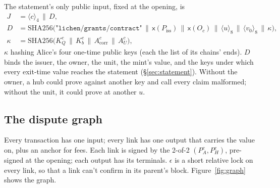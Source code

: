 \documentclass[11pt]{article}
\theoremstyle{plain}
\theoremstyle{definition}
\newcommand{\be}[2]{\langle #1\rangle_{#2}}
\newcommand{\xo}[1]{\mathsf{x}(#1)}
\newcommand{\Piss}{P_{\mathrm{iss}}}
\newcommand{\PH}{P_H^{c}}
\newcommand{\Oc}{O_c}
\newcommand{\KQ}{K_{Q}^{c}}
\newcommand{\Kb}{K_{b}^{c}}
\newcommand{\Acorr}{A_{\mathrm{corr}}^{c}}
\newcommand{\AU}{A_{U}^{c}}
\begin{document}
The statement's only public input, fixed at the opening, is
\begin{align*}
  J &= \be{c}{4} \,\|\, D,\\
  D &= \mathrm{SHA256}\big(\texttt{"lichen/grants/contract"} \,\|\,
  \xo{\Piss} \,\|\, \xo{\Oc} \,\|\, \be{u}{8} \,\|\, \be{v_0}{8} \,\|\,
  \kappa\big),\\
  \kappa &= \mathrm{SHA256}\big(\KQ \,\|\, \Kb \,\|\, \Acorr \,\|\, \AU\big),
\end{align*}
$\kappa$ hashing Alice's four one-time public keys (each the list of its
chains' ends). $D$ binds the issuer, the owner, the unit, the mint's
value, and the keys under which every exit-time value reaches the
statement (\S\ref{sec:statement}). Without the owner, a hub could prove
against another key and call every claim malformed; without the unit,
it could prove at another $u$.

\subsection{The dispute graph}\label{sec:graph}

Every transaction has one input; every link has one output that carries
the value on, plus an anchor for fees. Each link is signed by the 2-of-2
$(P_A^c, \PH)$, pre-signed at the opening; each output has its
terminals. $\epsilon$ is a short relative lock on every link, so that a
link can't confirm in its parent's block. Figure~\ref{fig:graph} shows
the graph.
\end{document}
